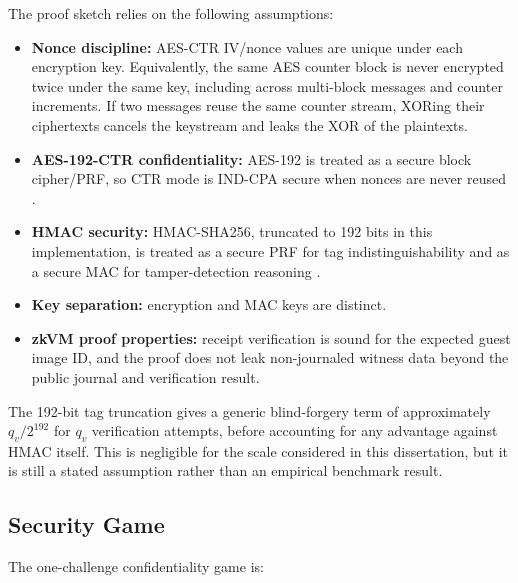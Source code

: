 The proof sketch relies on the following assumptions:

\begin{itemize}
\item \textbf{Nonce discipline:} AES-CTR IV/nonce values are unique under each
encryption key. Equivalently, the same AES counter block is never encrypted twice
under the same key, including across multi-block messages and counter increments.
If two messages reuse the same counter stream, XORing their ciphertexts cancels
the keystream and leaks the XOR of the plaintexts.
\item \textbf{AES-192-CTR confidentiality:} AES-192 is treated as a secure block
cipher/PRF, so CTR mode is IND-CPA secure when nonces are never reused
\cite{nistfips197,nistsp80038a,katz2020introduction}.
\item \textbf{HMAC security:} HMAC-SHA256, truncated to 192 bits in this
implementation, is treated as a secure PRF for tag indistinguishability and as a
secure MAC for tamper-detection reasoning \cite{rfc2104,nistfips1981}.
\item \textbf{Key separation:} encryption and MAC keys are distinct.
\item \textbf{zkVM proof properties:} receipt verification is sound for the
expected guest image ID, and the proof does not leak non-journaled witness data
beyond the public journal and verification result.
\end{itemize}

The 192-bit tag truncation gives a generic blind-forgery term of approximately
\(q_v / 2^{192}\) for \(q_v\) verification attempts, before accounting for any
advantage against HMAC itself. This is negligible for the scale considered in
this dissertation, but it is still a stated assumption rather than an empirical
benchmark result.

\subsection{Security Game}

The one-challenge confidentiality game is:


